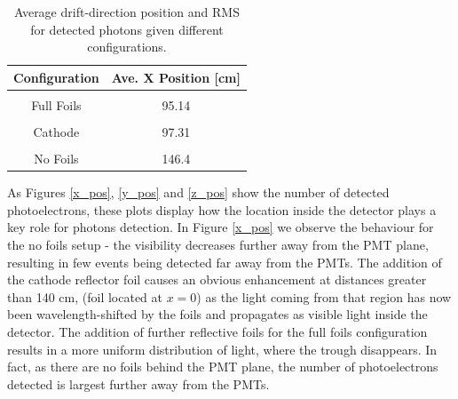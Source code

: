 \documentclass[a4paper]{article}
\begin{document}
\begin{table}[H]
	\begin{center}
	\begin{tabular}{| c || c |}
	\hline
	Configuration & Ave. X Position [cm]\\
	\hline
	 &\\
	 Full Foils & 95.14\\
	 &\\
	 Cathode & 97.31\\
	 &\\
	 No Foils & 146.4\\
	\hline
	\end{tabular}
	\end{center}
	\caption{Average drift-direction position and RMS for detected photons given different configurations.}\label{x_table}
	\end{table}

As Figures \ref{x_pos}, \ref{y_pos} and \ref{z_pos} show the number of detected photoelectrons, these plots display how the location inside the detector plays a key role for photons detection. In Figure \ref{x_pos} we observe the behaviour for the no foils setup - the visibility decreases further away from the PMT plane, resulting in few events being detected far away from the PMTs. The addition of the cathode reflector foil causes an obvious enhancement at distances greater than 140 cm, (foil located at $x = 0$) as the light coming from that region has now been wavelength-shifted by the foils and propagates as visible light inside the detector. The addition of further reflective foils for the full foils configuration results in a more uniform distribution of light, where the trough disappears. In fact, as there are no foils behind the PMT plane, the number of photoelectrons detected is largest further away from the PMTs.
\end{document}
